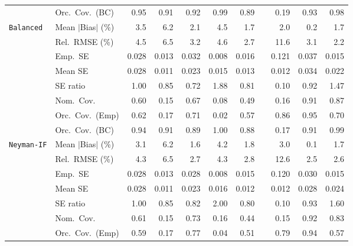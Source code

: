 \begin{landscape}
\begin{longtable}{llrrrrrrrrr}
 & Orc.\ Cov.\ (BC) & \cellcolor{rankone}0.95 & 0.91 & \cellcolor{rankthree}0.92 & 0.99 & 0.89 &  & 0.19 & \cellcolor{ranktwo}0.93 & \cellcolor{rankthree}0.98 \\
\addlinespace[2pt]
\quad \texttt{Balanced} & Mean $|$Bias$|$ (\%) & 3.5 & 6.2 & 2.1 & 4.5 & \cellcolor{ranktwo}1.7 &  & \cellcolor{rankthree}2.0 & \cellcolor{rankone}0.2 & \cellcolor{ranktwo}1.7 \\
 & Rel.\ RMSE (\%) & 4.5 & 6.5 & 3.2 & 4.6 & \cellcolor{ranktwo}2.7 &  & 11.6 & \cellcolor{rankthree}3.1 & \cellcolor{rankone}2.2 \\
 & Emp.\ SE & 0.028 & 0.013 & 0.032 & 0.008 & 0.016 &  & 0.121 & 0.037 & 0.015 \\
 & Mean SE & 0.028 & 0.011 & 0.023 & 0.015 & 0.013 &  & 0.012 & 0.034 & 0.022 \\
 & SE ratio & \cellcolor{rankone}1.00 & \cellcolor{rankthree}0.85 & 0.72 & 1.88 & 0.81 &  & 0.10 & \cellcolor{ranktwo}0.92 & 1.47 \\
 & Nom.\ Cov. & 0.60 & 0.15 & \cellcolor{rankthree}0.67 & 0.08 & 0.49 &  & 0.16 & \cellcolor{rankone}0.91 & \cellcolor{ranktwo}0.87 \\
 & Orc.\ Cov.\ (Emp) & 0.62 & 0.17 & \cellcolor{rankthree}0.71 & 0.02 & 0.57 &  & \cellcolor{ranktwo}0.86 & \cellcolor{rankone}0.95 & 0.70 \\
 & Orc.\ Cov.\ (BC) & \cellcolor{rankone}0.94 & \cellcolor{ranktwo}0.91 & 0.89 & \cellcolor{rankthree}1.00 & 0.88 &  & 0.17 & \cellcolor{ranktwo}0.91 & \cellcolor{ranktwo}0.99 \\
\addlinespace[2pt]
\quad \texttt{Neyman-IF} & Mean $|$Bias$|$ (\%) & 3.1 & 6.2 & \cellcolor{ranktwo}1.6 & 4.2 & 1.8 &  & 3.0 & \cellcolor{rankone}0.1 & \cellcolor{rankthree}1.7 \\
 & Rel.\ RMSE (\%) & 4.3 & 6.5 & \cellcolor{rankthree}2.7 & 4.3 & 2.8 &  & 12.6 & \cellcolor{rankone}2.5 & \cellcolor{ranktwo}2.6 \\
 & Emp.\ SE & 0.028 & 0.013 & 0.028 & 0.008 & 0.015 &  & 0.120 & 0.030 & 0.015 \\
 & Mean SE & 0.028 & 0.011 & 0.023 & 0.016 & 0.012 &  & 0.012 & 0.028 & 0.024 \\
 & SE ratio & \cellcolor{rankone}1.00 & \cellcolor{rankthree}0.85 & 0.82 & 2.00 & 0.80 &  & 0.10 & \cellcolor{ranktwo}0.93 & 1.60 \\
 & Nom.\ Cov. & 0.61 & 0.15 & \cellcolor{rankthree}0.73 & 0.16 & 0.44 &  & 0.15 & \cellcolor{rankone}0.92 & \cellcolor{ranktwo}0.83 \\
 & Orc.\ Cov.\ (Emp) & 0.59 & 0.17 & \cellcolor{rankthree}0.77 & 0.04 & 0.51 &  & \cellcolor{ranktwo}0.79 & \cellcolor{rankone}0.94 & 0.57 \\

\end{longtable}
\end{landscape}
